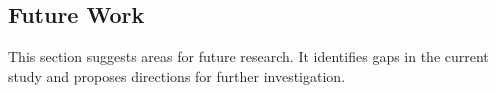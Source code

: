 \subsection{Future Work}

This section suggests areas for future research. It identifies gaps in the current study and proposes directions for further investigation.